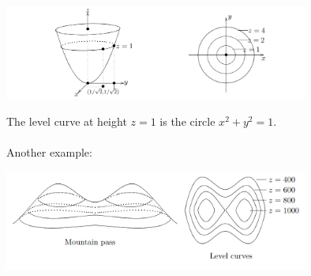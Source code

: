 \documentclass{report}
\begin{document}
\begin{figure}[h]
\begin{center}
\includegraphics[width=10cm]{94}\\
\end{center}
The level curve at height $z=1$ is the circle $x^2+y^2=1$.\\
\vspace{1mm}\\
Another example:
\begin{center}
\includegraphics[width=10cm]{95}\\
\end{center}
\end{figure}
\newpage
\end{document}
